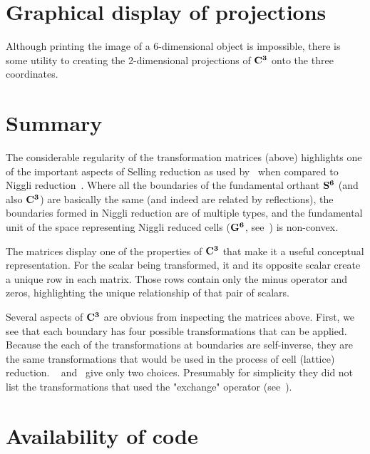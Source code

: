 \documentclass[]{iucr}              %
\numberwithin{equation}{section}
\newcommand{\SVI}[0]{$\bf{S^{6}}$}
\newcommand{\GVI}[0]{$\bf{G^{6}}$}
\newcommand{\CIII}[0]{$\bf{C^{3}}$}
\begin{document}
	
	\section{Graphical display of projections}
	
	Although printing the image of a 6-dimensional object
	is impossible, there is some utility to creating the
	2-dimensional projections of \CIII{} onto the three
	coordinates. 
	
	
	
	
	\section{Summary}
	
	The considerable regularity 
	of the transformation matrices (above) highlights one
	of the important aspects of Selling reduction 
	as used by~
	when compared to Niggli reduction~\cite{Niggli1928}. 
	Where all the 	boundaries of the fundamental orthant 
	\SVI{} (and also \CIII{}) are basically the same 
	(and indeed are related by reflections), 
	the boundaries formed in Niggli reduction are of multiple types, 
	and the fundamental unit of the space representing 
	Niggli reduced cells (\GVI{}, see~) is non-convex.
	
	The matrices display one of the properties of \CIII{} 
	that make it a useful conceptual representation. 
	For the scalar being transformed, it and its 
	opposite scalar create a unique row in each matrix. 
	Those rows contain
	only the minus operator and zeros, 
	highlighting the unique relationship of that pair of scalars.
	
	Several aspects of \CIII{} are obvious from inspecting the matrices above. 
	First, we see that each boundary has four possible 
	transformations that can be applied. 
	Because the each of the transformations at boundaries are self-inverse, 
	they are the same transformations that would 
	be used in the process of cell (lattice) reduction. 
	~ and~ give 
	only two choices. Presumably for simplicity they did not list
	the transformations that used the "exchange" operator 
	(see~\cite{andrews2019b}).
	
	
	
	
	
	\section{Availability of code}
	
\end{document}
